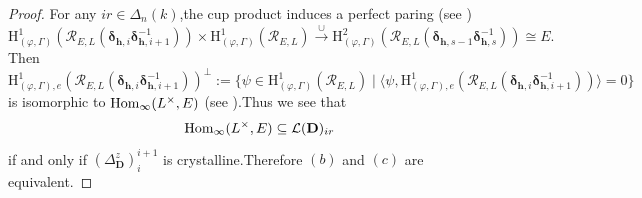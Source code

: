 \documentclass[SecEq,CM,GP]{degruyter-crelle} %
\theoremstyle{plain}
\newcommand{\Dpik}{{\mathbf{D}}}
\newcommand{\homo}{{\rm Hom}}
\newcommand{\hH}{{\mathrm{H}}}
\newcommand{\padelc}{{(\Delta_{\Dpik}^z)}}
\newcommand{\bh}{{\mathbf{h}}}
\newcommand{\cR}{\mathcal R}
\newcommand{\sL}{\mathcal L}
\begin{document}
\begin{proof} For any $ir\in \Delta_n(k)$,\;the cup product induces a perfect paring (see \cite[Lemma 1.13]{2015Ding})
\[\hH^1_{(\varphi,\Gamma)}(\cR_{E,L}(\bm{\delta}_{\bh,i}\bm{\delta}_{\bh,i+1}^{-1}))\times\hH^1_{(\varphi,\Gamma)}(\cR_{E,L})\xrightarrow{\cup}\hH^2_{(\varphi,\Gamma)}(\cR_{E,L}(\bm{\delta}_{\bh,s-1}\bm{\delta}_{\bh,s}^{-1}))\cong E.\]
Then 	$\hH^1_{(\varphi,\Gamma),e}(\cR_{E,L}(\bm{\delta}_{\bh,i}\bm{\delta}_{\bh,i+1}^{-1}))^\bot:=\{\psi\in \hH^1_{(\varphi,\Gamma)}(\cR_{E,L})\;|\;\langle\psi,\hH^1_{(\varphi,\Gamma),e}(\cR_{E,L}(\bm{\delta}_{\bh,i}\bm{\delta}_{\bh,i+1}^{-1}))\rangle=0\}$ is isomorphic to $\homo_\infty(L^\times,E)$ (see \cite[Proposition 1.9,\;Lemma 1.15]{2015Ding}).\;Thus we see that \[\homo_\infty(L^\times,E)\subseteq\sL(\Dpik)_{ir}\] if and only if $\padelc^{i+1}_{i}$ is crystalline.\;Therefore $(b)$ and $(c)$ are equivalent.\;


\end{proof}
\end{document}
